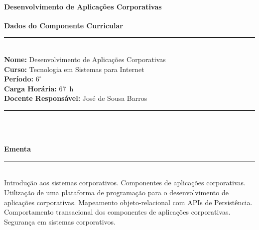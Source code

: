 \paragraph{Desenvolvimento de Aplicações Corporativas}

\begin{center}\textbf{Dados do Componente Curricular}\end{center}
\vspace{-5mm}
\noindent\rule{16.5cm}{0.4pt}
\\
\textbf{Nome:} Desenvolvimento de Aplicações Corporativas
\\
\textbf{Curso:} Tecnologia em Sistemas para Internet
\\ 
\textbf{Período:} $6^{\circ}$ 
\\
\textbf{Carga Horária:} 67~h
\\ 
\textbf{Docente Responsável:} José de Sousa Barros 
\\ 
\noindent\rule{16.5cm}{0.4pt}\\
\\
\vspace{-12mm}
\begin{center}\textbf{Ementa}\end{center}
\vspace{-5mm}
\noindent\rule{16.5cm}{0.4pt}
\\
Introdução aos sistemas corporativos. Componentes de aplicações corporativas.  Utilização de uma plataforma de programação para o desenvolvimento de aplicações corporativas. Mapeamento objeto-relacional com APIs de Persistência. Comportamento transacional dos componentes de aplicações corporativas. Segurança em sistemas corporativos.\\

